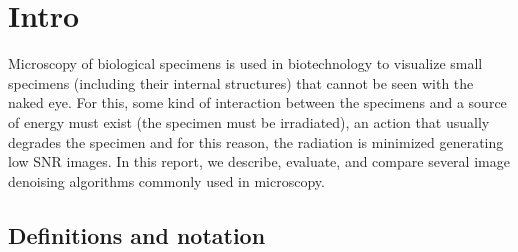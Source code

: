 \chapter{Intro}


  Microscopy of biological specimens is used in biotechnology to
  visualize small specimens (including their internal structures) that
  cannot be seen with the naked eye. For this, some kind of
  interaction between the specimens and a source of energy must exist
  (the specimen must be irradiated), an action that usually degrades
  the specimen and for this reason, the radiation is minimized
  generating low SNR images. In this report, we describe, evaluate,
  and compare several image denoising algorithms commonly used in
  microscopy.

\section*{Definitions and notation}

